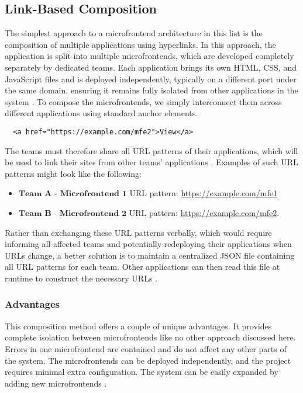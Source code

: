 \subsection{Link-Based Composition}
The simplest approach to a microfrontend architecture in this list is the composition of multiple applications using hyperlinks. In this approach, the application is split into multiple microfrontends, which are developed completely separately by dedicated teams. Each application brings its own HTML, CSS, and JavaScript files and is deployed independently, typically on a different port under the same domain, ensuring it remains fully isolated from other applications in the system \cite{Geers}. To compose the microfrontends, we simply interconnect them across different applications using standard anchor elements.
\begin{lstlisting}
  <a href="https://example.com/mfe2">View</a>
\end{lstlisting}
The teams must therefore share all URL patterns of their applications, which will be used to link their sites from other teams' applications \cite{Geers}. Examples of such URL patterns might look like the following:
\begin{itemize}
  \item $\textbf{Team A - Microfrontend 1}$ \newline
  URL pattern: \url{https://example.com/mfe1}
  \item $\textbf{Team B - Microfrontend 2}$ \newline
  URL pattern: \url{https://example.com/mfe2}.
\end{itemize}
Rather than exchanging these URL patterns verbally, which would require informing all affected teams and potentially redeploying their applications when URLs change, a better solution is to maintain a centralized JSON file containing all URL patterns for each team. Other applications can then read this file at runtime to construct the necessary URLs \cite{Geers}.

\subsubsection{Advantages}
This composition method offers a couple of unique advantages. It provides complete isolation between microfrontends like no other approach discussed here. Errors in one microfrontend are contained and do not affect any other parts of the system. The microfrontends can be deployed independently, and the project requires minimal extra configuration. The system can be easily expanded by adding new microfrontends \cite{Geers}.

